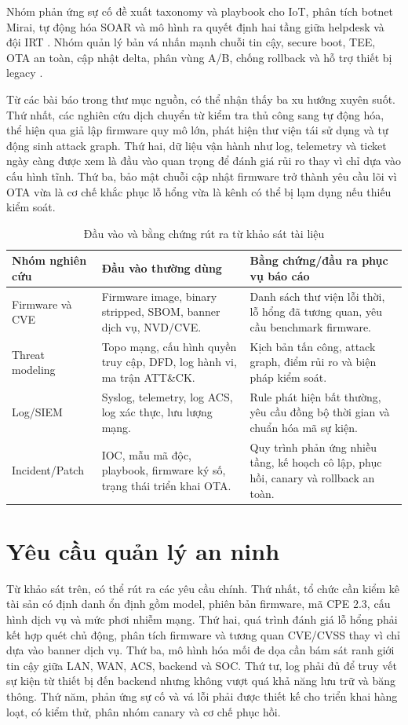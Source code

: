 \documentclass[../DoAn.tex]{subfiles}
\begin{document}
Nhóm phản ứng sự cố đề xuất taxonomy và playbook cho IoT, phân tích botnet Mirai, tự động hóa SOAR và mô hình ra quyết định hai tầng giữa helpdesk và đội IRT \cite{irtiot2023,mirai2025,soar2025,twotierir2023}. Nhóm quản lý bản vá nhấn mạnh chuỗi tin cậy, secure boot, TEE, OTA an toàn, cập nhật delta, phân vùng A/B, chống rollback và hỗ trợ thiết bị legacy \cite{trustchain2025,secureota2025,deltaota2024,rollback2024}.

Từ các bài báo trong thư mục nguồn, có thể nhận thấy ba xu hướng xuyên suốt. Thứ nhất, các nghiên cứu dịch chuyển từ kiểm tra thủ công sang tự động hóa, thể hiện qua giả lập firmware quy mô lớn, phát hiện thư viện tái sử dụng và tự động sinh attack graph. Thứ hai, dữ liệu vận hành như log, telemetry và ticket ngày càng được xem là đầu vào quan trọng để đánh giá rủi ro thay vì chỉ dựa vào cấu hình tĩnh. Thứ ba, bảo mật chuỗi cập nhật firmware trở thành yêu cầu lõi vì OTA vừa là cơ chế khắc phục lỗ hổng vừa là kênh có thể bị lạm dụng nếu thiếu kiểm soát.

\begin{table}[htbp]
\centering
\begin{tabular}{|p{3cm}|p{4.8cm}|p{5cm}|}
\hline
\textbf{Nhóm nghiên cứu} & \textbf{Đầu vào thường dùng} & \textbf{Bằng chứng/đầu ra phục vụ báo cáo} \\ \hline
Firmware và CVE & Firmware image, binary stripped, SBOM, banner dịch vụ, NVD/CVE. & Danh sách thư viện lỗi thời, lỗ hổng đã tương quan, yêu cầu benchmark firmware. \\ \hline
Threat modeling & Topo mạng, cấu hình quyền truy cập, DFD, log hành vi, ma trận ATT\&CK. & Kịch bản tấn công, attack graph, điểm rủi ro và biện pháp kiểm soát. \\ \hline
Log/SIEM & Syslog, telemetry, log ACS, log xác thực, lưu lượng mạng. & Rule phát hiện bất thường, yêu cầu đồng bộ thời gian và chuẩn hóa mã sự kiện. \\ \hline
Incident/Patch & IOC, mẫu mã độc, playbook, firmware ký số, trạng thái triển khai OTA. & Quy trình phản ứng nhiều tầng, kế hoạch cô lập, phục hồi, canary và rollback an toàn. \\ \hline
\end{tabular}
\caption{Đầu vào và bằng chứng rút ra từ khảo sát tài liệu}
\label{tab:survey-evidence}
\end{table}

\section{Yêu cầu quản lý an ninh}
Từ khảo sát trên, có thể rút ra các yêu cầu chính. Thứ nhất, tổ chức cần kiểm kê tài sản có định danh ổn định gồm model, phiên bản firmware, mã CPE 2.3, cấu hình dịch vụ và mức phơi nhiễm mạng. Thứ hai, quá trình đánh giá lỗ hổng phải kết hợp quét chủ động, phân tích firmware và tương quan CVE/CVSS thay vì chỉ dựa vào banner dịch vụ. Thứ ba, mô hình hóa mối đe dọa cần bám sát ranh giới tin cậy giữa LAN, WAN, ACS, backend và SOC. Thứ tư, log phải đủ để truy vết sự kiện từ thiết bị đến backend nhưng không vượt quá khả năng lưu trữ và băng thông. Thứ năm, phản ứng sự cố và vá lỗi phải được thiết kế cho triển khai hàng loạt, có kiểm thử, phân nhóm canary và cơ chế phục hồi.
\end{document}
